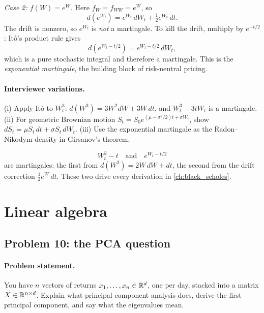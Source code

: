 \emph{Case 2: $f(W) = e^W$.}  Here $f_W = f_{WW} = e^W$, so
\[
d(e^{W_t}) = e^{W_t}\,dW_t + \tfrac{1}{2} e^{W_t}\,dt.
\]
The drift is nonzero, so $e^{W_t}$ is \emph{not} a martingale.
To kill the drift, multiply by $e^{-t/2}$: It\^o's product rule
gives
\[
d(e^{W_t - t/2}) = e^{W_t - t/2}\,dW_t,
\]
which is a pure stochastic integral and therefore a martingale.
This is the \emph{exponential martingale}, the building block of
risk-neutral pricing.

\paragraph{Interviewer variations.}
(i) Apply It\^o to $W_t^3$: $d(W^3) = 3W^2 dW + 3W\,dt$, and
$W_t^3 - 3t W_t$ is a martingale.  (ii) For geometric Brownian
motion $S_t = S_0 e^{(\mu - \sigma^2/2)t + \sigma W_t}$, show
$dS_t = \mu S_t\,dt + \sigma S_t\,dW_t$.  (iii) Use the
exponential martingale as the Radon--Nikodym density in
Girsanov's theorem.

\begin{keyfactbox}
\[
W_t^2 - t \quad\text{and}\quad e^{W_t - t/2}
\]
are martingales: the first from $d(W^2) = 2W\,dW + dt$, the
second from the drift correction $\tfrac{1}{2} e^W\,dt$.  These
two drive every derivation in \cref{ch:black_scholes}.
\end{keyfactbox}

\section{Linear algebra}
\label{sec:linalg-problems}

\subsection{Problem 10: the PCA question}
\label{sec:pca}

\paragraph{Problem statement.}
You have $n$ vectors of returns $x_1, \dots, x_n \in \mathbb{R}^d$, one
per day, stacked into a matrix $X \in \mathbb{R}^{n \times d}$.  Explain
what principal component analysis does, derive the first
principal component, and say what the eigenvalues mean.

